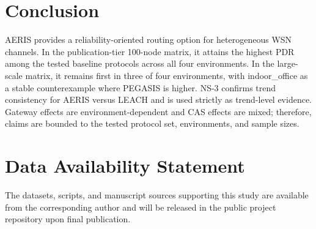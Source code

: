 \documentclass[sensors,article,submit,moreauthors,pdftex]{Definitions/mdpi}
\begin{document}
\section{Conclusion}
AERIS provides a reliability-oriented routing option for heterogeneous WSN channels. In the publication-tier 100-node matrix, it attains the highest PDR among the tested baseline protocols across all four environments. In the large-scale matrix, it remains first in three of four environments, with indoor\_office as a stable counterexample where PEGASIS is higher. NS-3 confirms trend consistency for AERIS versus LEACH and is used strictly as trend-level evidence. Gateway effects are environment-dependent and CAS effects are mixed; therefore, claims are bounded to the tested protocol set, environments, and sample sizes.

\section*{Data Availability Statement}
The datasets, scripts, and manuscript sources supporting this study are available from the corresponding author and will be released in the public project repository upon final publication.


\end{document}
